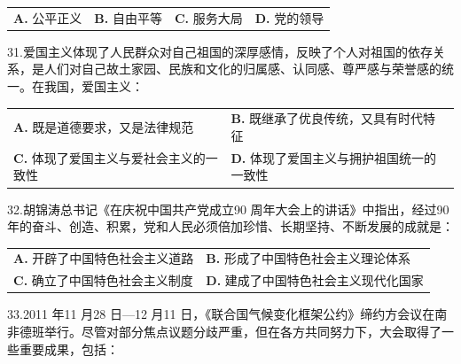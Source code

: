 \documentclass[UTF8,11pt]{ctexart}
\begin{document}
\begin{center}\begin{tabular}{>{\raggedright\arraybackslash}p{\dimexpr(\linewidth-8\tabcolsep)/4\relax}>{\raggedright\arraybackslash}p{\dimexpr(\linewidth-8\tabcolsep)/4\relax}>{\raggedright\arraybackslash}p{\dimexpr(\linewidth-8\tabcolsep)/4\relax}>{\raggedright\arraybackslash}p{\dimexpr(\linewidth-8\tabcolsep)/4\relax}}
\textbf{A.} 公平正义 & \textbf{B.} 自由平等 & \textbf{C.} 服务大局 & \textbf{D.} 党的领导\\[.35em]\end{tabular}\end{center}

31.爱国主义体现了人民群众对自己祖国的深厚感情，反映了个人对祖国的依存关系，是人们对自己故土家园、民族和文化的归属感、认同感、尊严感与荣誉感的统一。在我国，爱国主义：


\begin{center}\begin{tabular}{>{\raggedright\arraybackslash}p{\dimexpr(\linewidth-4\tabcolsep)/2\relax}>{\raggedright\arraybackslash}p{\dimexpr(\linewidth-4\tabcolsep)/2\relax}}
\textbf{A.} 既是道德要求，又是法律规范 & \textbf{B.} 既继承了优良传统，又具有时代特征\\[.35em]
\textbf{C.} 体现了爱国主义与爱社会主义的一致性 & \textbf{D.} 体现了爱国主义与拥护祖国统一的一致性\\[.35em]\end{tabular}\end{center}

32.胡锦涛总书记《在庆祝中国共产党成立90 周年大会上的讲话》中指出，经过90 年的奋斗、创造、积累，党和人民必须倍加珍惜、长期坚持、不断发展的成就是：


\begin{center}\begin{tabular}{>{\raggedright\arraybackslash}p{\dimexpr(\linewidth-4\tabcolsep)/2\relax}>{\raggedright\arraybackslash}p{\dimexpr(\linewidth-4\tabcolsep)/2\relax}}
\textbf{A.} 开辟了中国特色社会主义道路 & \textbf{B.} 形成了中国特色社会主义理论体系\\[.35em]
\textbf{C.} 确立了中国特色社会主义制度 & \textbf{D.} 建成了中国特色社会主义现代化国家\\[.35em]\end{tabular}\end{center}

33.2011 年11 月28 日—12 月11 日，《联合国气候变化框架公约》缔约方会议在南非德班举行。尽管对部分焦点议题分歧严重，但在各方共同努力下，大会取得了一些重要成果，包括：
\end{document}
